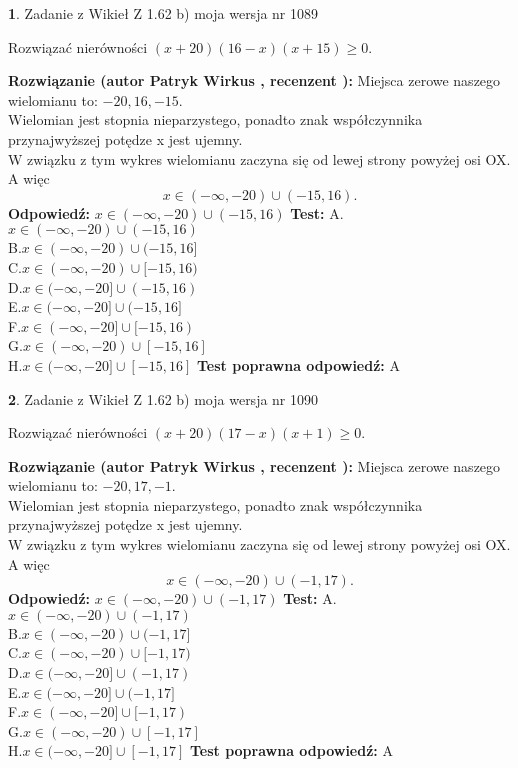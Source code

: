 \documentclass[12pt, a4paper]{article}
\theoremstyle{definition} %
\newtheorem{zad}{}
\newcommand{\zadStart}[1]{\begin{zad}#1\newline}
\newcommand{\zadStop}{\end{zad}}
\newcommand{\rozwStart}[2]{\noindent \textbf{Rozwiązanie (autor #1 , recenzent #2): }\newline}
\newcommand{\rozwStop}{\newline}
\newcommand{\odpStart}{\noindent \textbf{Odpowiedź:}\newline}
\newcommand{\odpStop}{\newline}
\newcommand{\testStart}{\noindent \textbf{Test:}\newline}
\newcommand{\testStop}{\newline}
\newcommand{\kluczStart}{\noindent \textbf{Test poprawna odpowiedź:}\newline}
\newcommand{\kluczStop}{\newline}
\begin{document}
\zadStart{Zadanie z Wikieł Z 1.62 b) moja wersja nr 1089}

Rozwiązać nierówności $(x+20)(16-x)(x+15)\ge0$.
\zadStop
\rozwStart{Patryk Wirkus}{}
Miejsca zerowe naszego wielomianu to: $-20, 16, -15$.\\
Wielomian jest stopnia nieparzystego, ponadto znak współczynnika przy\linebreak najwyższej potędze x jest ujemny.\\ W związku z tym wykres wielomianu zaczyna się od lewej strony powyżej osi OX. A więc $$x \in (-\infty,-20) \cup (-15,16).$$
\rozwStop
\odpStart
$x \in (-\infty,-20) \cup (-15,16)$
\odpStop
\testStart
A.$x \in (-\infty,-20) \cup (-15,16)$\\
B.$x \in (-\infty,-20) \cup (-15,16]$\\
C.$x \in (-\infty,-20) \cup [-15,16)$\\
D.$x \in (-\infty,-20] \cup (-15,16)$\\
E.$x \in (-\infty,-20] \cup (-15,16]$\\
F.$x \in (-\infty,-20] \cup [-15,16)$\\
G.$x \in (-\infty,-20) \cup [-15,16]$\\
H.$x \in (-\infty,-20] \cup [-15,16]$
\testStop
\kluczStart
A
\kluczStop



\zadStart{Zadanie z Wikieł Z 1.62 b) moja wersja nr 1090}

Rozwiązać nierówności $(x+20)(17-x)(x+1)\ge0$.
\zadStop
\rozwStart{Patryk Wirkus}{}
Miejsca zerowe naszego wielomianu to: $-20, 17, -1$.\\
Wielomian jest stopnia nieparzystego, ponadto znak współczynnika przy\linebreak najwyższej potędze x jest ujemny.\\ W związku z tym wykres wielomianu zaczyna się od lewej strony powyżej osi OX. A więc $$x \in (-\infty,-20) \cup (-1,17).$$
\rozwStop
\odpStart
$x \in (-\infty,-20) \cup (-1,17)$
\odpStop
\testStart
A.$x \in (-\infty,-20) \cup (-1,17)$\\
B.$x \in (-\infty,-20) \cup (-1,17]$\\
C.$x \in (-\infty,-20) \cup [-1,17)$\\
D.$x \in (-\infty,-20] \cup (-1,17)$\\
E.$x \in (-\infty,-20] \cup (-1,17]$\\
F.$x \in (-\infty,-20] \cup [-1,17)$\\
G.$x \in (-\infty,-20) \cup [-1,17]$\\
H.$x \in (-\infty,-20] \cup [-1,17]$
\testStop
\kluczStart
A
\kluczStop
\end{document}
